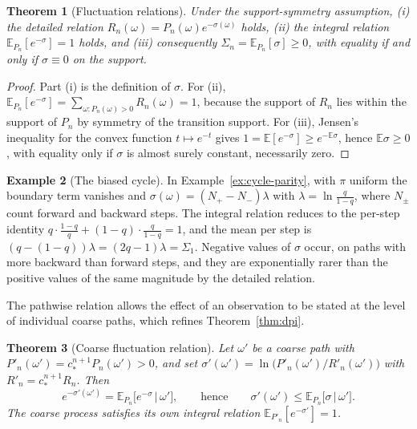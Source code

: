 \documentclass[11pt,oneside]{book}
\newtheorem{theorem}{Theorem}[chapter]
\theoremstyle{definition}
\newtheorem{example}[theorem]{Example}
\theoremstyle{remark}
\begin{document}
\begin{theorem}[Fluctuation relations]\label{thm:ift}
Under the support-symmetry assumption, (i) the detailed relation $R_n(\omega)=P_n(\omega)e^{-\sigma(\omega)}$ holds, (ii) the integral relation $\mathbb E_{P_n}[e^{-\sigma}]=1$ holds, and (iii) consequently $\Sigma_n=\mathbb E_{P_n}[\sigma]\geq0$, with equality if and only if $\sigma\equiv0$ on the support.
\end{theorem}

\begin{proof}
Part (i) is the definition of $\sigma$. For (ii), $\mathbb E_{P_n}[e^{-\sigma}]=\sum_{\omega:P_n(\omega)>0}R_n(\omega)=1$, because the support of $R_n$ lies within the support of $P_n$ by symmetry of the transition support. For (iii), Jensen's inequality for the convex function $t\mapsto e^{-t}$ gives $1=\mathbb E[e^{-\sigma}]\geq e^{-\mathbb E\sigma}$, hence $\mathbb E\sigma\geq0$, with equality only if $\sigma$ is almost surely constant, necessarily zero.
\end{proof}

\begin{example}[The biased cycle]
In Example~\ref{ex:cycle-parity}, with $\pi$ uniform the boundary term vanishes and $\sigma(\omega)=(N_+-N_-)\lambda$ with $\lambda=\ln\frac q{1-q}$, where $N_\pm$ count forward and backward steps. The integral relation reduces to the per-step identity $q\cdot\frac{1-q}{q}+(1-q)\cdot\frac q{1-q}=1$, and the mean per step is $(q-(1-q))\lambda=(2q-1)\lambda=\Sigma_1$. Negative values of $\sigma$ occur, on paths with more backward than forward steps, and they are exponentially rarer than the positive values of the same magnitude by the detailed relation.
\end{example}

The pathwise relation allows the effect of an observation to be stated at the level of individual coarse paths, which refines Theorem~\ref{thm:dpi}.

\begin{theorem}[Coarse fluctuation relation]\label{thm:coarse-ift}
Let $\omega'$ be a coarse path with $P'_n(\omega')=c^{n+1}_*P_n(\omega')>0$, and set $\sigma'(\omega')=\ln\bigl(P'_n(\omega')/R'_n(\omega')\bigr)$ with $R'_n=c^{n+1}_*R_n$. Then
\[
e^{-\sigma'(\omega')}=\mathbb E_{P_n}\bigl[e^{-\sigma}\,\big|\,\omega'\bigr],\qquad\text{hence}\qquad\sigma'(\omega')\leq\mathbb E_{P_n}\bigl[\sigma\,\big|\,\omega'\bigr].
\]
The coarse process satisfies its own integral relation $\mathbb E_{P'_n}[e^{-\sigma'}]=1$.
\end{theorem}
\end{document}

